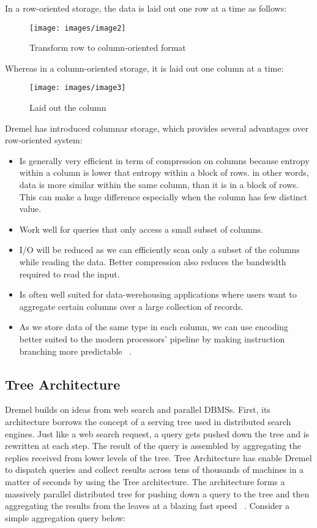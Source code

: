 \documentclass[9pt,twocolumn,twoside]{styles/osajnl}
\begin{document}
In a row-oriented storage, the data is laid out one row at a time as follows:


\begin{figure}[H]
 \centering
\texttt{[image: images/image2]}
\caption{Transform row to column-oriented format}
\end{figure}

Whereas in a column-oriented storage, it is laid out one column at a time:

\begin{figure}[H]
 \centering
\texttt{[image: images/image3]}
\caption{Laid out the column}
\end{figure}

Dremel has introduced columnar storage, which  provides several advantages over row-oriented system:

\begin{itemize}
  \item Is generally very efficient in term of compression on columns because entropy within a column is lower that entropy within a block of rows. in other words, data is more similar within the same column, than it is in a block of rows. This can make a huge difference especially when the column has few distinct value.
  \item Work well for queries that only access a small subset of columns. 
  \item I/O will be reduced as we can efficiently scan only a subset of the columns while reading the data. Better compression also reduces the bandwidth required to read the input.
  \item Is often well suited for data-werehousing applications where users want to aggregate certain columns over a large collection of records. 
  \item As we store data of the same type in each column, we can use encoding better suited to the modern processors’ pipeline by making instruction branching more predictable ~\cite{book-hadoop-apps}.
\end{itemize}


\subsection{Tree Architecture}
Dremel builds on ideas from web search and parallel DBMSs. First, its architecture borrows the concept of a serving tree used in distributed search engines. Just like a web search request, a query gets pushed down the tree and is rewritten at each step. The result of the query is assembled by aggregating the replies received from lower levels of the tree. Tree Architecture has enable Dremel to dispatch queries and collect results across tens of thousands of machines in a matter of seconds by using the Tree architecture. The architecture forms a massively parallel distributed tree for pushing down a query to the tree and then aggregating the results from the leaves at a blazing fast speed ~\cite{twitter-dremel}. Consider a simple aggregation query below:
\end{document}
